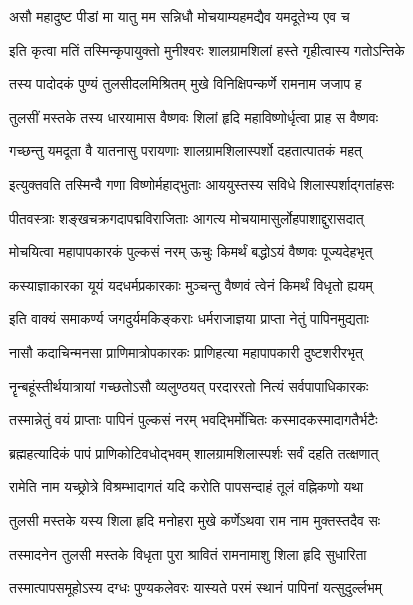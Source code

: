 \twolineshloka
{असौ महादुष्ट पीडां मा यातु मम सन्निधौ}
{मोचयाम्यहमद्यैव यमदूतेभ्य एव च}%

\twolineshloka
{इति कृत्वा मतिं तस्मिन्कृपायुक्तो मुनीश्वरः}
{शालग्रामशिलां हस्ते गृहीत्वास्य गतोऽन्तिके}%

\twolineshloka
{तस्य पादोदकं पुण्यं तुलसीदलमिश्रितम्}
{मुखे विनिक्षिपन्कर्णे रामनाम जजाप ह}%

\twolineshloka
{तुलसीं मस्तके तस्य धारयामास वैष्णवः}
{शिलां हृदि महाविष्णोर्धृत्वा प्राह स वैष्णवः}%

\twolineshloka
{गच्छन्तु यमदूता वै यातनासु परायणाः}
{शालग्रामशिलास्पर्शो दहतात्पातकं महत्}%

\twolineshloka
{इत्युक्तवति तस्मिन्वै गणा विष्णोर्महाद्भुताः}
{आययुस्तस्य सविधे शिलास्पर्शाद्गतांहसः}%

\twolineshloka
{पीतवस्त्राः शङ्खचक्रगदापद्मविराजिताः}
{आगत्य मोचयामासुर्लोहपाशाद्दुरासदात्}%

\twolineshloka
{मोचयित्वा महापापकारकं पुल्कसं नरम्}
{ऊचुः किमर्थं बद्धोऽयं वैष्णवः पूज्यदेहभृत्}%

\twolineshloka
{कस्याज्ञाकारका यूयं यदधर्मप्रकारकाः}
{मुञ्चन्तु वैष्णवं त्वेनं किमर्थं विधृतो ह्ययम्}%

\twolineshloka
{इति वाक्यं समाकर्ण्य जगदुर्यमकिङ्कराः}
{धर्मराजाज्ञया प्राप्ता नेतुं पापिनमुद्यताः}%

\twolineshloka
{नासौ कदाचिन्मनसा प्राणिमात्रोपकारकः}
{प्राणिहत्या महापापकारी दुष्टशरीरभृत्}%

\twolineshloka
{नॄन्बहूंस्तीर्थयात्रायां गच्छतोऽसौ व्यलुण्ठयत्}
{परदाररतो नित्यं सर्वपापाधिकारकः}%

\twolineshloka
{तस्मान्नेतुं वयं प्राप्ताः पापिनं पुल्कसं नरम्}
{भवद्भिर्मोचितः कस्मादकस्मादागतैर्भटैः}%


\twolineshloka
{ब्रह्महत्यादिकं पापं प्राणिकोटिवधोद्भवम्}
{शालग्रामशिलास्पर्शः सर्वं दहति तत्क्षणात्}%

\twolineshloka
{रामेति नाम यच्छ्रोत्रे विश्रम्भादागतं यदि}
{करोति पापसन्दाहं तूलं वह्निकणो यथा}%

\twolineshloka
{तुलसी मस्तके यस्य शिला हृदि मनोहरा}
{मुखे कर्णेऽथवा राम नाम मुक्तस्तदैव सः}%

\twolineshloka
{तस्मादनेन तुलसी मस्तके विधृता पुरा}
{श्रावितं रामनामाशु शिला हृदि सुधारिता}%

\twolineshloka
{तस्मात्पापसमूहोऽस्य दग्धः पुण्यकलेवरः}
{यास्यते परमं स्थानं पापिनां यत्सुदुर्ल्लभम्}%

